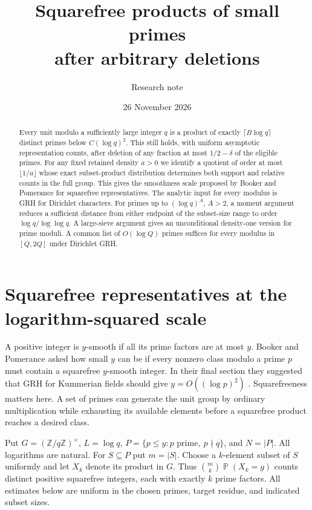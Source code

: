 \documentclass[11pt]{article}
\title{\textbf{Squarefree products of small primes\protect\\ after arbitrary deletions}}
\author{Research note}
\date{26 November 2026}
\DeclareMathOperator{\Prob}{\mathbb P}
\begin{document}
\maketitle
\begin{abstract}
Every unit modulo a sufficiently large integer $q$ is a product of exactly
$\lceil B\log q\rceil$ distinct primes below $C(\log q)^2$.
This still holds, with uniform asymptotic representation counts, after deletion
of any fraction at most $1/2-\delta$ of the eligible primes. For any fixed
retained density $a>0$ we identify a quotient of order at most $\lfloor1/a\rfloor$
whose exact subset-product distribution determines both support and relative
counts in the full group. This gives the smoothness scale proposed by Booker
and Pomerance for squarefree representatives. The analytic input for every
modulus is GRH for Dirichlet characters.
For primes up to $(\log q)^A$, $A>2$, a moment argument reduces a sufficient
distance from either endpoint of the subset-size range to order
$\log q/\log\log q$. A large-sieve argument gives an unconditional
density-one version for prime moduli. A common list of $O(\log Q)$ primes
suffices for every modulus in $[Q,2Q]$ under Dirichlet GRH.
\end{abstract}

\section{Squarefree representatives at the logarithm-squared scale}
A positive integer is $y$-smooth if all its prime factors are at most $y$.
Booker and Pomerance asked how small $y$ can be if every nonzero class modulo
a prime $p$ must contain a squarefree $y$-smooth integer. In their final
section they suggested that GRH for Kummerian fields should give
$y=O((\log p)^2)$ \cite{bp}. Squarefreeness matters here. A set of primes
can generate the unit group by ordinary multiplication while exhausting its
available elements before a squarefree product reaches a desired class.

Put $G=(\mathbb Z/q\mathbb Z)^\times$, $L=\log q$,
$P=\{p\le y:p\text{ prime},\ p\nmid q\}$, and $N=|P|$. All logarithms
are natural. For $S\subseteq P$ put $m=|S|$. Choose a $k$-element subset of
$S$ uniformly and let $X_k$ denote its product in $G$.
Thus $\binom mk\Prob(X_k=g)$ counts distinct positive squarefree integers,
each with exactly $k$ prime factors. All estimates below are uniform in the
chosen primes, target residue, and indicated subset sizes.
\end{document}

